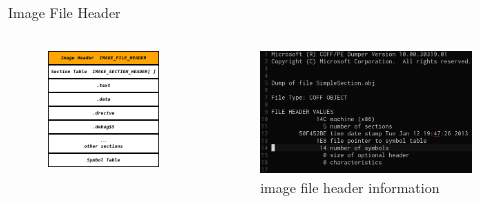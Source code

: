 \begin{frame}{Image File Header}
    \begin{columns}[t]
        \begin{figure}
            \begin{center}
                \includegraphics[width=.5\textwidth]{./image/imagefileheader.png}
            \end{center}
        \end{figure}
        \begin{figure}
            \begin{center}
                \includegraphics[width=\textwidth]{./image/objimghdr.png}
                \caption{image file header information}
            \end{center}
        \end{figure}
    \end{columns}
\end{frame}

